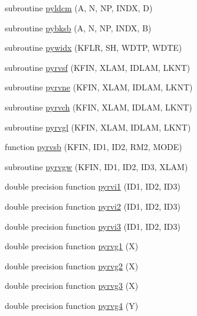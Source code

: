 \begin{DoxyCompactItemize}
\item 
subroutine \hyperlink{pythia-6_84_824_8f_a465ce78bf5535730bbe484acfcdb5574}{pyldcm} (A, N, N\+P, I\+N\+D\+X, D)
\item 
subroutine \hyperlink{pythia-6_84_824_8f_a67f01dfbb9f068146c6823e5df8822de}{pybksb} (A, N, N\+P, I\+N\+D\+X, B)
\item 
subroutine \hyperlink{pythia-6_84_824_8f_a62d5cd78a67f9f9a83ba37293a56e95c}{pywidx} (K\+F\+L\+R, S\+H, W\+D\+T\+P, W\+D\+T\+E)
\item 
subroutine \hyperlink{pythia-6_84_824_8f_aa77e2a4f89c76ba674ab9cac330ec8cd}{pyrvsf} (K\+F\+I\+N, X\+L\+A\+M, I\+D\+L\+A\+M, L\+K\+N\+T)
\item 
subroutine \hyperlink{pythia-6_84_824_8f_af64d7b9f2943cb831c935b51901191a5}{pyrvne} (K\+F\+I\+N, X\+L\+A\+M, I\+D\+L\+A\+M, L\+K\+N\+T)
\item 
subroutine \hyperlink{pythia-6_84_824_8f_a7452e5c7a826962ce1c001af995ed6ef}{pyrvch} (K\+F\+I\+N, X\+L\+A\+M, I\+D\+L\+A\+M, L\+K\+N\+T)
\item 
subroutine \hyperlink{pythia-6_84_824_8f_a9cc390826ed9a3821e2295bf3cfa3ccd}{pyrvgl} (K\+F\+I\+N, X\+L\+A\+M, I\+D\+L\+A\+M, L\+K\+N\+T)
\item 
function \hyperlink{pythia-6_84_824_8f_abbd1ec6f2beaa101781110b202abb06f}{pyrvsb} (K\+F\+I\+N, I\+D1, I\+D2, R\+M2, M\+O\+D\+E)
\item 
subroutine \hyperlink{pythia-6_84_824_8f_a615871b7d284b85342c32545140f6435}{pyrvgw} (K\+F\+I\+N, I\+D1, I\+D2, I\+D3, X\+L\+A\+M)
\item 
double precision function \hyperlink{pythia-6_84_824_8f_a42b2d221de531f661ead0e1bef14807b}{pyrvi1} (I\+D1, I\+D2, I\+D3)
\item 
double precision function \hyperlink{pythia-6_84_824_8f_a9e6ea2faa5ba1af425bd3782c8069d02}{pyrvi2} (I\+D1, I\+D2, I\+D3)
\item 
double precision function \hyperlink{pythia-6_84_824_8f_a797da463f08ad3ff91ca5d428c5f5cc7}{pyrvi3} (I\+D1, I\+D2, I\+D3)
\item 
double precision function \hyperlink{pythia-6_84_824_8f_a2fc031269f435aa5547d90d480213f0d}{pyrvg1} (X)
\item 
double precision function \hyperlink{pythia-6_84_824_8f_a371f64ca765777a5a87c152e18482a4a}{pyrvg2} (X)
\item 
double precision function \hyperlink{pythia-6_84_824_8f_a23fb42dd91c099fbcd5cd2001c74e98d}{pyrvg3} (X)
\item 
double precision function \hyperlink{pythia-6_84_824_8f_a4de5cb4846e35b7378ff15e9a97710c4}{pyrvg4} (Y)

\end{DoxyCompactItemize}
